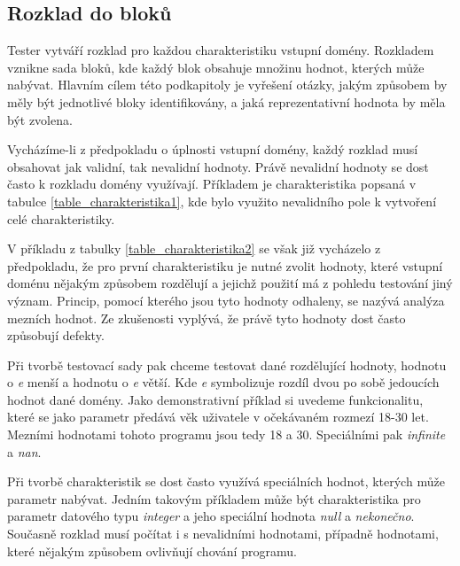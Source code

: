 
\subsection*{Rozklad do bloků}
\label{subsec_RozkladDomenyDoBloku}

Tester vytváří rozklad pro každou charakteristiku vstupní domény. Rozkladem vznikne sada bloků, kde každý blok obsahuje množinu hodnot, kterých může nabývat. Hlavním cílem této podkapitoly je vyřešení otázky, jakým způsobem by měly být jednotlivé bloky identifikovány, a jaká reprezentativní hodnota by měla být zvolena.


Vycházíme-li z předpokladu o úplnosti vstupní domény, každý rozklad musí obsahovat jak validní, tak nevalidní hodnoty. Právě nevalidní hodnoty se dost často k rozkladu domény využívají. Příkladem je charakteristika popsaná v tabulce \ref{table_charakteristika1}, kde bylo využito nevalidního pole k vytvoření celé charakteristiky.


V příkladu z tabulky \ref{table_charakteristika2} se však již vycházelo z předpokladu, že pro první charakteristiku je nutné zvolit hodnoty, které vstupní doménu nějakým způsobem rozdělují a jejichž použití má z pohledu testování jiný význam. Princip, pomocí kterého jsou tyto hodnoty odhaleny, se nazývá analýza mezních hodnot. Ze zkušenosti vyplývá, že právě tyto hodnoty dost často způsobují defekty. 

Při tvorbě testovací sady pak chceme testovat dané rozdělující hodnoty, hodnotu o \textit{e} menší a hodnotu o \textit{e} větší. Kde \textit{e} symbolizuje rozdíl dvou po sobě jedoucích hodnot dané domény. Jako demonstrativní příklad si uvedeme funkcionalitu, které se jako parametr předává věk uživatele v očekávaném rozmezí 18-30 let. Mezními hodnotami tohoto programu jsou tedy 18 a 30. Speciálními pak \textit{infinite} a \textit{nan}.

Při tvorbě charakteristik se dost často využívá speciálních hodnot, kterých může parametr nabývat. Jedním takovým příkladem může být charakteristika pro parametr datového typu \textit{integer} a jeho speciální hodnota \textit{null} a \textit{nekonečno}. Současně rozklad musí počítat i s nevalidními hodnotami, případně hodnotami, které nějakým způsobem ovlivňují chování programu. 

